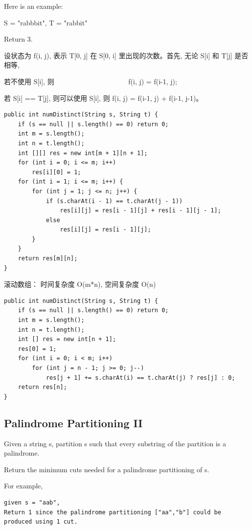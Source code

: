 \documentclass[12pt]{book}
\begin{document}
Here is an example:

S = "rabbbit", T = "rabbit"

Return 3.

设状态为 f(i, j), 表示 T[0, j] 在 S[0, i] 里出现的次数。首先, 无论 S[i] 和 T[j] 是否相等, 

若不使用 S[i], 则~ ~ ~ ~ ~ ~ ~ ~ ~ ~ ~ ~ ~ f(i, j) = f(i-1, j); 

若 S[i] == T[j], 则可以使用 S[i], 则 f(i, j) = f(i-1, j) + f(i-1, j-1)。

\lstset{language=java,label= ,caption= ,numbers=none}
\begin{lstlisting}
public int numDistinct(String s, String t) {
    if (s == null || s.length() == 0) return 0;
    int m = s.length();
    int n = t.length();
    int [][] res = new int[m + 1][n + 1];
    for (int i = 0; i <= m; i++) 
        res[i][0] = 1;
    for (int i = 1; i <= m; i++) {
        for (int j = 1; j <= n; j++) {
            if (s.charAt(i - 1) == t.charAt(j - 1))
                res[i][j] = res[i - 1][j] + res[i - 1][j - 1];
            else
                res[i][j] = res[i - 1][j];
        }
    }
    return res[m][n];
}
\end{lstlisting}

滚动数组： 时间复杂度 O(m*n), 空间复杂度 O(n)
\lstset{language=java,label= ,caption= ,numbers=none}
\begin{lstlisting}
public int numDistinct(String s, String t) {
    if (s == null || s.length() == 0) return 0;
    int m = s.length();
    int n = t.length();
    int [] res = new int[n + 1];
    res[0] = 1;
    for (int i = 0; i < m; i++) 
        for (int j = n - 1; j >= 0; j--) 
            res[j + 1] += s.charAt(i) == t.charAt(j) ? res[j] : 0;
    return res[n];
}
\end{lstlisting}

\subsection{Palindrome Partitioning II}
\label{sec-14-3-5}
Given a string s, partition s such that every substring of the partition is a palindrome.

Return the minimum cuts needed for a palindrome partitioning of s.

For example, 
\lstset{language=java,label= ,caption= ,numbers=none}
\begin{lstlisting}
given s = "aab",
Return 1 since the palindrome partitioning ["aa","b"] could be produced using 1 cut.
\end{lstlisting}
\end{document}
